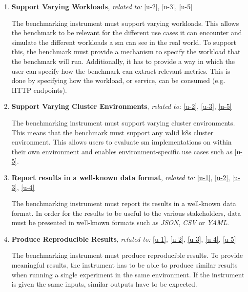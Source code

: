 \begin{enumerate}[label=\textbf{FR\arabic*}, leftmargin=3\parindent]
    \item \textbf{Support Varying Workloads}, \textit{related to:} \ref{u-2}, \ref{u-3}, \ref{u-5} 
    \label{system:fr-4}
    
    The benchmarking instrument must support varying workloads. This allows the benchmark to be relevant for the different use cases it can encounter and simulate the different workloads a \gls{sm} can see in the real world. To support this, the benchmark must provide a mechanism to specify the workload that the benchmark will run. Additionally, it has to provide a way in which the user can specify how the benchmark can extract relevant metrics. This is done by specifying how the workload, or service, can be consumed (e.g. HTTP endpoints).
    
    \item \textbf{Support Varying Cluster Environments}, \textit{related to:} \ref{u-2}, \ref{u-3}, \ref{u-5} 
    \label{system:fr-5}
    
    The benchmarking instrument must support varying cluster environments. This means that the benchmark must support any valid \gls{k8s} cluster environment. This allows users to evaluate \gls{sm} implementations on within their own environment and enables environment-specific use cases such as \ref{u-5}.
    
    \item \textbf{Report results in a well-known data format}, \textit{related to:} \ref{u-1}, \ref{u-2}, \ref{u-3}, \ref{u-4}
    \label{system:fr-6}
    
    The benchmarking instrument must report its results in a well-known data format. In order for the results to be useful to the various stakeholders, data must be presented in well-known formats such as \textit{JSON}, \textit{CSV} or \textit{YAML}.
    
    
    \item \textbf{Produce Reproducible Results}, \textit{related to:} \ref{u-1}, \ref{u-2}, \ref{u-3}, \ref{u-4}, \ref{u-5} 
    \label{system:fr-7}
    
    The benchmarking instrument must produce reproducible results. To provide meaningful results, the instrument has to be able to produce similar results when running a single experiment in the same environment. If the instrument is given the same inputs, similar outputs have to be expected.
    
\end{enumerate}

